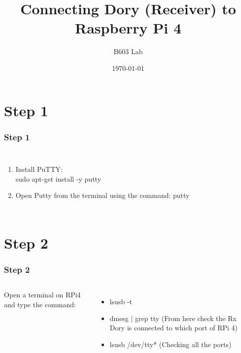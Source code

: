 \documentclass{beamer}
\title{Connecting Dory (Receiver) to Raspberry Pi 4}
\author{B603 Lab}
\institute{Indian Institute of Technology, Hyderabad.}
\date{\today}
\begin{document}
\begin{frame}
\titlepage
\end{frame}

\section{Step 1}
\begin{frame}
\frametitle{Step 1}
\begin{columns}
  \begin{enumerate}
  \item Install PuTTY: \\sudo apt-get install -y putty\\
  \vspace{10pt}
  \item Open Putty from the terminal using the command: putty
  
  \end{enumerate}
\end{columns}

\end{frame}

\section{Step 2}
\begin{frame}
\frametitle{Step 2}
\begin{columns}
Open a terminal on RPi4 and type the command:
  \begin{itemize}
  \item  lsusb -t
  \vspace{10pt}
  \item dmesg $|$ grep tty  (From here check the Rx Dory is connected to which port of RPi 4)
  \vspace{10pt}
  \item lsusb /dev/tty* (Checking all the ports)
  
  \end{itemize}
\end{columns}



\end{frame}
\end{document}
